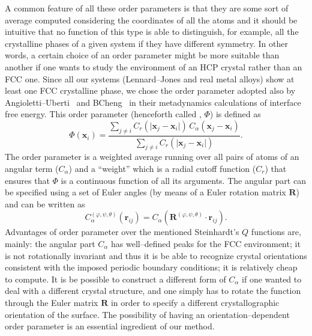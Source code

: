 A common feature of all these order parameters is that they are some sort of average computed considering the coordinates of all the atoms and it should be intuitive that no function of this type is able to distinguish, for example, all the crystalline phases of a given system if they have different symmetry. In other words, a certain choice of an order parameter might be more suitable than another if one wants to study the environment of an HCP crystal rather than an FCC one.
Since all our systems (Lennard--Jones and real metal alloys) show at least one FCC crystalline phase, we chose the order parameter adopted also by Angioletti--Uberti~\cite{Angioletti-Uberti2010} and BCheng~\cite{Cheng2015} in their metadynamics calculations of interface free energy. This order parameter (henceforth called \fcc, $\Phi$) is defined as
\begin{equation}
\label{eqn:fccubic}
    \Phi(\bm{x}_i)=\frac{\sum_{j\neq i} C_r(\lvert \bm{x}_j-\bm{x}_i\rvert)\, C_{\alpha}(\bm{x}_j-\bm{x}_i) }{\sum_{j\neq i} C_r(\lvert \bm{x}_j-\bm{x}_i\rvert)}.
\end{equation}
The \fcc order parameter is a weighted average running over all pairs of atoms of an angular term ($C_{\alpha}$) and a ``weight'' which is a radial cutoff function ($C_r$) that ensures that $\Phi$ is a continuous function of all its arguments. The angular part can be specified using a set of Euler angles (by means of a Euler rotation matrix $\bm{R}$) and can be written as
\begin{equation}
\label{eqn:c_alpha}
C^{(\varphi,\psi,\theta)}_{\alpha} (\bm{r}_{ij})= C_{\alpha}(\bm{R}^{(\varphi,\psi,\theta)}\cdot \bm{r}_{ij}).
\end{equation}
Advantages of \fcc order parameter over the mentioned Steinhardt's $Q$ functions are, mainly: the angular part $C_{\alpha}$ has well--defined peaks for the FCC environment; it is not rotationally invariant and thus it is be able to recognize crystal orientations consistent with the imposed periodic boundary conditions; it is relatively cheap to compute. It is be possible to construct a different form of $C_{\alpha}$ if one wanted to deal with a different crystal structure,
and one simply has to rotate the function through the Euler matrix $\bm{R}$ in order to specify a different crystallographic orientation of the surface. The possibility of having an orientation--dependent order parameter is an essential ingredient of our method.

